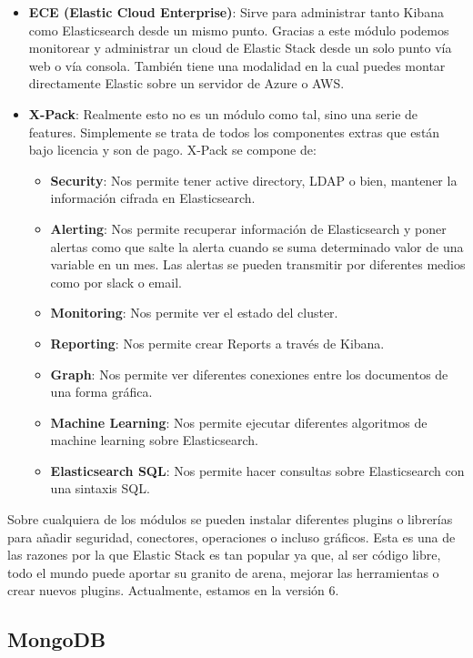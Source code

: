\begin{itemize}
        \item \textbf{ECE (Elastic Cloud Enterprise)}: Sirve para administrar tanto Kibana como Elasticsearch desde un mismo punto. Gracias a este módulo podemos monitorear y administrar un cloud de Elastic Stack desde un solo punto vía web o vía consola. También tiene una modalidad en la cual puedes montar directamente Elastic sobre un servidor de Azure o AWS.
        \item \textbf{X-Pack}: Realmente esto no es un módulo como tal, sino una serie de features. Simplemente se trata de todos los componentes extras que están bajo licencia y son de pago. X-Pack se compone de:
\begin{itemize}
        \item \textbf{Security}: Nos permite tener active directory, LDAP o bien, mantener la información cifrada en Elasticsearch.
        \item \textbf{Alerting}: Nos permite recuperar información de Elasticsearch y poner alertas como que salte la alerta cuando se suma determinado valor de una variable en un mes. Las alertas se pueden transmitir por diferentes medios como por slack o email.
        \item \textbf{Monitoring}: Nos permite ver el estado del cluster.
        \item \textbf{Reporting}: Nos permite crear Reports a través de Kibana.
        \item \textbf{Graph}: Nos permite ver diferentes conexiones entre los documentos de una forma gráfica.
        \item \textbf{Machine Learning}: Nos permite ejecutar diferentes algoritmos de machine learning sobre Elasticsearch.
        \item\textbf{ Elasticsearch SQL}: Nos permite hacer consultas sobre Elasticsearch con una sintaxis SQL.
\end{itemize}
\end{itemize}
Sobre cualquiera de los módulos se pueden instalar diferentes plugins o librerías para añadir seguridad, conectores, operaciones o incluso gráficos. Esta es una de las razones por la que Elastic Stack es tan popular ya que, al ser código libre, todo el mundo puede aportar su granito de arena, mejorar las herramientas o crear nuevos plugins. Actualmente, estamos en la versión 6.

\subsection{MongoDB\label{MongoDB}}



